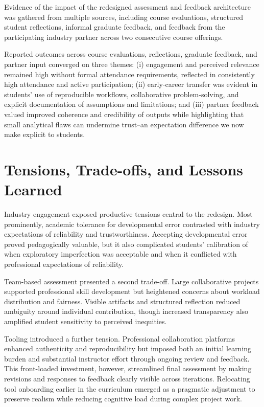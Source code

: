 Evidence of the impact of the redesigned assessment and feedback architecture was gathered from multiple sources, including course evaluations, structured student reflections, informal graduate feedback, and feedback from the participating industry partner across two consecutive course offerings.

Reported outcomes across course evaluations, reflections, graduate feedback, and partner input converged on three themes:
(i) engagement and perceived relevance remained high without formal attendance requirements, reflected in consistently high attendance and active participation;
(ii) early-career transfer was evident in students’ use of reproducible workflows, collaborative problem-solving, and explicit documentation of assumptions and limitations; and
(iii) partner feedback valued improved coherence and credibility of outputs while highlighting that small analytical flaws can undermine trust--an expectation difference we now make explicit to students.


\section{Tensions, Trade-offs, and Lessons Learned}

Industry engagement exposed productive tensions central to the redesign. Most prominently, academic tolerance for developmental error contrasted with industry expectations of reliability and trustworthiness. Accepting developmental error proved pedagogically valuable, but it also complicated students' calibration of when exploratory imperfection was acceptable and when it conflicted with professional expectations of reliability.

Team-based assessment presented a second trade-off. Large collaborative projects supported professional skill development but heightened concerns about workload distribution and fairness. Visible artifacts and structured reflection reduced ambiguity around individual contribution, though increased transparency also amplified student sensitivity to perceived inequities.

Tooling introduced a further tension. Professional collaboration platforms enhanced authenticity and reproducibility but imposed both an initial learning burden and substantial instructor effort through ongoing review and feedback. This front-loaded investment, however, streamlined final assessment by making revisions and responses to feedback clearly visible across iterations. Relocating tool onboarding earlier in the curriculum emerged as a pragmatic adjustment to preserve realism while reducing cognitive load during complex project work.


